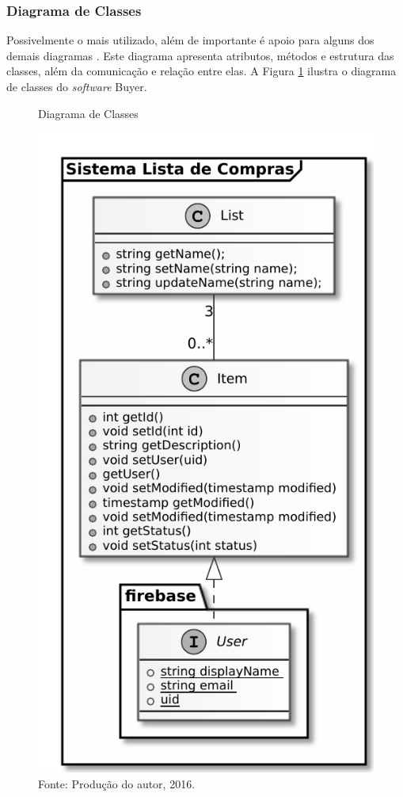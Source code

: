 \documentclass[
	12pt,
	openright,
	oneside, %
	a4paper,
	chapter=TITLE,
	section=TITLE,
	english,
	brazil %
	]{abntex2-udesc}
\begin{document}
\subsubsection{Diagrama de Classes}

Possivelmente o mais utilizado, além de importante é apoio para alguns dos demais diagramas \cite{guedes2011}. Este diagrama apresenta atributos, métodos e estrutura das classes, além da comunicação e relação entre elas. A Figura \ref{fig:classes} ilustra o diagrama de classes do \textit{software} Buyer.

\begin{figure}[h]
\caption{Diagrama de Classes}\label{fig:classes}
\centering
\includegraphics{figures/classes.pdf}
\caption*{\footnotesize Fonte: Produção do autor, 2016.}
\end{figure}
\end{document}
